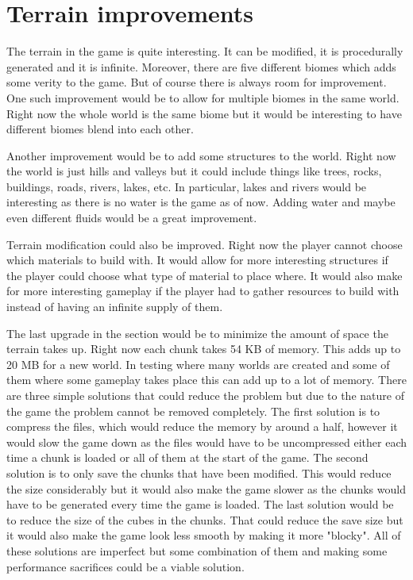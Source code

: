 \section{Terrain improvements}
The terrain in the game is quite interesting.
It can be modified, it is procedurally generated and it is infinite.
Moreover, there are five different biomes which adds some verity to the game.
But of course there is always room for improvement.
One such improvement would be to allow for multiple biomes in the same world.
Right now the whole world is the same biome but it would be interesting to have different biomes blend into each other.

Another improvement would be to add some structures to the world.
Right now the world is just hills and valleys but it could include things like trees, rocks, buildings, roads, rivers, lakes, etc.
In particular, lakes and rivers would be interesting as there is no water is the game as of now.
Adding water and maybe even different fluids would be a great improvement.

Terrain modification could also be improved.
Right now the player cannot choose which materials to build with.
It would allow for more interesting structures if the player could choose what type of material to place where.
It would also make for more interesting gameplay if the player had to gather resources to build with instead of having an infinite supply of them.

The last upgrade in the section would be to minimize the amount of space the terrain takes up.
Right now each chunk takes 54 KB of memory.
This adds up to 20 MB for a new world.
In testing where many worlds are created and some of them where some gameplay takes place this can add up to a lot of memory.
There are three simple solutions that could reduce the problem but due to the nature of the game the problem cannot be removed completely.
The first solution is to compress the files, which would reduce the memory by around a half, however it would slow the game down as the files would have to be uncompressed either each time a chunk is loaded or all of them at the start of the game.
The second solution is to only save the chunks that have been modified.
This would reduce the size considerably but it would also make the game slower as the chunks would have to be generated every time the game is loaded.
The last solution would be to reduce the size of the cubes in the chunks.
That could reduce the save size but it would also make the game look less smooth by making it more "blocky".
All of these solutions are imperfect but some combination of them and making some performance sacrifices could be a viable solution.